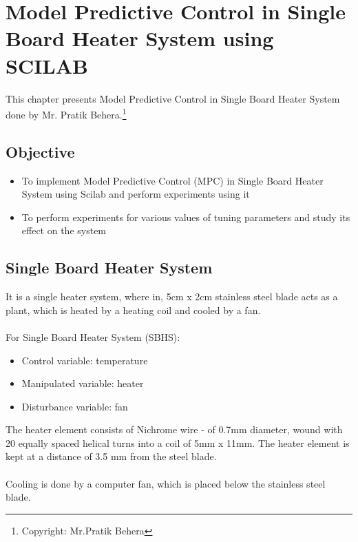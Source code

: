 
\chapter{Model Predictive Control in Single Board Heater System using\\ SCILAB}
This chapter presents Model Predictive Control in Single Board Heater System done by Mr. Pratik Behera.\footnote {Copyright: Mr.Pratik Behera}
\section{Objective}
\begin{itemize}
\item To implement Model Predictive Control (MPC) in Single Board Heater System using Scilab and perform experiments using it
\item To perform experiments for various values of tuning parameters and study its effect on the system 
\end{itemize}
\section{Single Board Heater System}
It is a single heater system, where in, 5cm x 2cm stainless steel blade acts as a plant, which is heated by a heating coil and cooled by a fan. \\ \\
For Single Board Heater System (SBHS): \\
\begin{itemize}
\item Control variable: temperature
\item Manipulated variable: heater
\item Disturbance variable: fan
\end{itemize}
The heater element consists of Nichrome wire - of 0.7mm diameter, wound with 20 equally spaced helical turns into a coil of 5mm x 11mm. The heater element is kept at a distance of 3.5 mm from the steel blade. \\ \\
Cooling is done by a computer fan, which is placed below the stainless steel blade.

